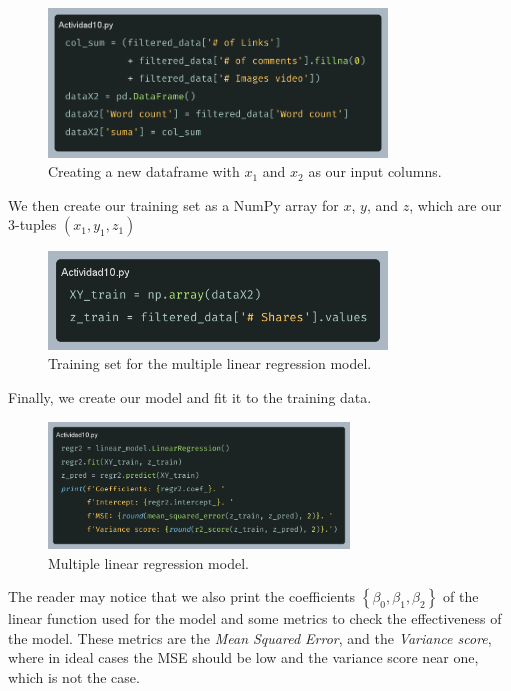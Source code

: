 \documentclass[10pt]{article}
\begin{document}
\begin{figure}[h]
  \centering
  \includegraphics[width=90mm]{images/2025-03-25-11-12-20}
  \caption{Creating a new dataframe with $x_{1}$ and $x_{2}$ as our input columns.}
\end{figure}

We then create our training set as a NumPy array for $x$, $y$, and $z$, which are our 3-tuples $(x_{1}, y_{1}, z_{1})$

\begin{figure}[h]
  \centering
  \includegraphics[width=90mm]{images/2025-03-25-11-16-52}
  \caption{Training set for the multiple linear regression model.}
\end{figure}

Finally, we create our model and fit it to the training data.

\begin{figure}[h]
  \centering
  \includegraphics[width=80mm]{images/2025-03-25-11-24-07}
  \caption{Multiple linear regression model.}
\end{figure}

The reader may notice that we also print the coefficients $\left\{\beta_{0}, \beta_{1}, \beta_{2}\right\}$ of the linear function used for the model and some metrics to check the effectiveness of the model. These metrics are the \textit{Mean Squared Error}, and the \textit{Variance score}, where in ideal cases the MSE should be low and the variance score near one, which is not the case.
\end{document}
